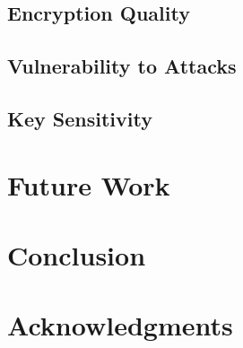 \documentclass[conference]{IEEEtran}
\begin{document}
\subsection{Encryption Quality}\label{subsec:encryption-quality}

\subsection{Vulnerability to Attacks}\label{subsec:vulnerability-to-attacks}

\subsection{Key Sensitivity}\label{subsec:key-sensitivity}

\section{Future Work}\label{sec:future-work}

\section{Conclusion}\label{sec:conclusion}

\section{Acknowledgments}\label{sec:acknowledgments}



\end{document}
